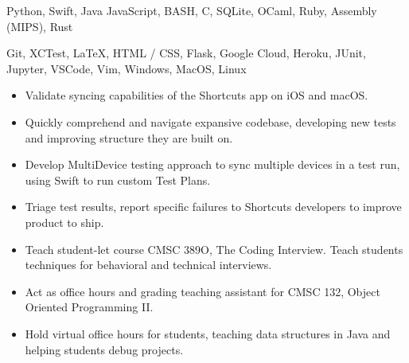 \documentclass[11pt]{article}
\begin{document}
\setlength\topsep{0pt}
{\fontsize{10}{12}\robotocondlight
     Python, Swift, Java  JavaScript, BASH, C, SQLite, OCaml, Ruby, Assembly (MIPS), Rust \par
    Git, XCTest, \LaTeX, HTML / CSS, Flask, Google Cloud, Heroku, JUnit, Jupyter, VSCode, Vim, Windows, MacOS, Linux \par
}

\hsep

\vspace{2mm}
{\fontsize{10}{12}\robotocondlight
    \begin{itemize}[noitemsep,nolistsep]
        \item Validate syncing capabilities of the Shortcuts app on iOS and macOS. 
        \item Quickly comprehend and navigate expansive codebase, developing new tests and improving structure they are built on. 
        \item Develop MultiDevice testing approach to sync multiple devices in a test run, using Swift to run custom Test Plans.
        \item Triage test results, report specific failures to Shortcuts developers to improve product to ship.
    \end{itemize}
    \vspace{3mm}
    \begin{itemize}[noitemsep,nolistsep]
        \item Teach student-let course CMSC 389O, The Coding Interview. Teach students techniques for behavioral and technical interviews. 
        \item Act as office hours and grading teaching assistant for CMSC 132, Object Oriented Programming II.
        \item Hold virtual office hours for students, teaching data structures in Java and helping students debug projects.
    \end{itemize}
    \vspace{3mm}

}
\end{document}
